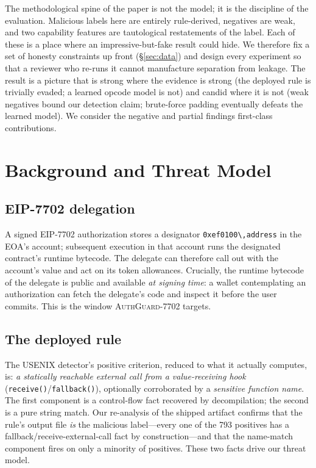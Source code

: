 \documentclass[conference]{IEEEtran}
\newcommand{\tool}{\textsc{AuthGuard-7702}}
\newcommand{\eip}{EIP-7702}
\newcommand{\code}[1]{\texttt{#1}}
\begin{document}
The methodological spine of the paper is not the model; it is the discipline of the
evaluation. Malicious labels here are entirely rule-derived, negatives are weak, and two
capability features are tautological restatements of the label. Each of these is a place
where an impressive-but-fake result could hide. We therefore fix a set of honesty
constraints up front (\S\ref{sec:data}) and design every experiment so that a reviewer who
re-runs it cannot manufacture separation from leakage. The result is a picture that is
strong where the evidence is strong (the deployed rule is trivially evaded; a learned
opcode model is not) and candid where it is not (weak negatives bound our detection claim;
brute-force padding eventually defeats the learned model). We consider the negative and
partial findings first-class contributions.

\section{Background and Threat Model}
\label{sec:background}

\subsection{\eip{} delegation}
A signed \eip{} authorization stores a designator \code{0xef0100\textbackslash,\textbar{}address} in the
EOA's account; subsequent execution in that account runs the designated contract's runtime
bytecode. The delegate can therefore call out with the account's value and act on its token
allowances. Crucially, the runtime bytecode of the delegate is public and available
\emph{at signing time}: a wallet contemplating an authorization can fetch the delegate's
code and inspect it before the user commits. This is the window \tool{} targets.

\subsection{The deployed rule}
The USENIX detector's positive criterion, reduced to what it actually computes, is:
\emph{a statically reachable external call from a value-receiving hook}
(\code{receive()}/\code{fallback()}), optionally corroborated by a
\emph{sensitive function name}. The first component is a control-flow fact recovered by
decompilation; the second is a pure string match. Our re-analysis of the shipped artifact
confirms that the rule's output file \emph{is} the malicious label---every one of the 793
positives has a fallback/receive-external-call fact by construction---and that the
name-match component fires on only a minority of positives. These two facts drive our
threat model.
\end{document}
